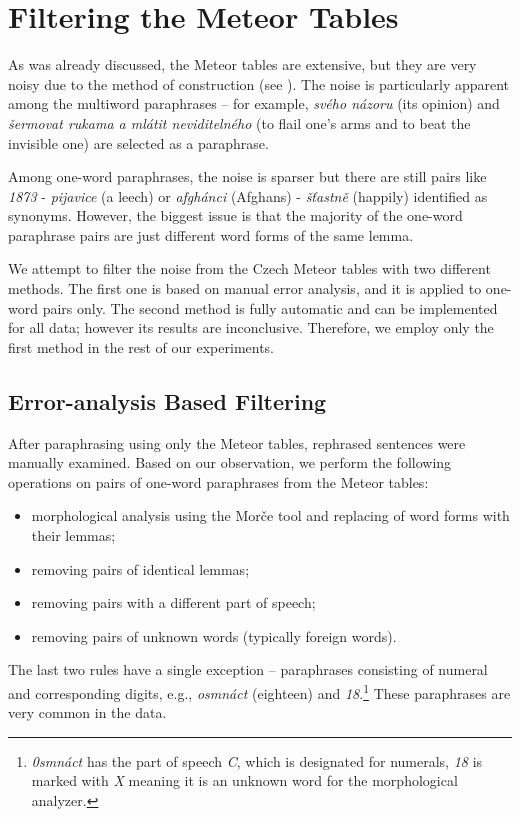 \section{Filtering the Meteor Tables}
\label{filtering-section}
As was already discussed, the Meteor tables are extensive, but they are very 
noisy due to the method of construction  (see ). The noise is 
particularly apparent among the multiword paraphrases -- for example, 
\textit{svého názoru}  (its opinion) and \textit{šermovat rukama a mlátit 
neviditelného} (to flail one's arms and to beat the invisible one) are selected 
as a paraphrase. 

Among one-word paraphrases, the noise is sparser but there are still pairs like 
\textit{1873} - \textit{pijavice} (a leech) or \textit{afgh\'{a}nci} (Afghans) - 
\textit{š\v{t}astně} (happily) identified as synonyms. However, the biggest 
issue is that the majority of the one-word paraphrase pairs are just different 
word forms of the same lemma.

We attempt to filter the noise from the Czech Meteor tables with two different 
methods. The first one is based on manual error analysis, and it is applied to 
one-word pairs only. The second method is fully automatic and can be 
implemented for all data; however its results are inconclusive. Therefore, we 
employ only the first method in the rest of our experiments.


\subsection{Error-analysis Based Filtering}
After paraphrasing using only the Meteor tables, rephrased sentences were 
manually examined. Based on our observation, we perform the following 
operations on pairs of one-word paraphrases from the Meteor tables:

\begin{itemize}
\item morphological analysis using the Morče tool \citep{morce:2007} and replacing of word forms with their lemmas; 
\item removing pairs of identical lemmas;
\item removing pairs with a different part of speech;
\item removing pairs of unknown words (typically foreign words).
\end{itemize}

The last two rules have a single exception -- paraphrases consisting of numeral 
and corresponding digits, e.g., \textit{osmnáct} (eighteen) and \textit{18}.\footnote{
\textit{0smnáct} has the part of speech \textit{C}, which is designated for numerals, 
\textit{18} is marked with \textit{X} meaning it is an unknown word for the 
morphological analyzer.} These paraphrases are very common in the data. 

